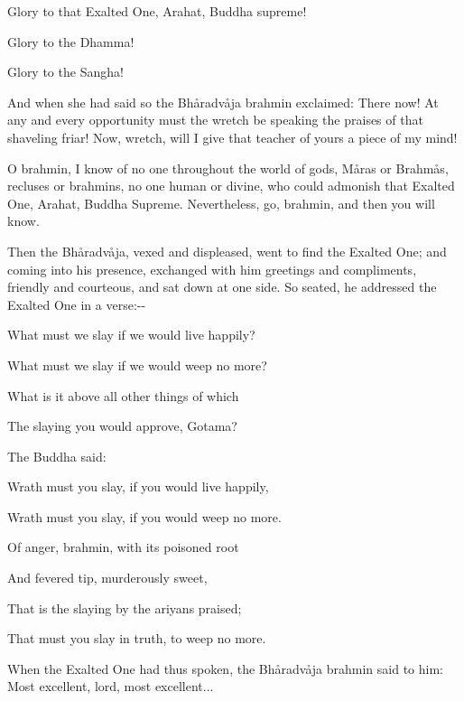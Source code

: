 \documentclass[12pt,twoside]{article}
\begin{document}
{\textasciigrave}{\textasciigrave}Glory to that Exalted One, Arahat,
Buddha supreme!

Glory to the Dhamma!

Glory to the Sangha!{\textquotesingle}{\textquotesingle}

And when she had said so the Bh{\aa}radv{\aa}ja brahmin exclaimed:
{\textasciigrave}{\textasciigrave}There now! At any and every
opportunity must the wretch be speaking the praises of that shaveling
friar! Now, wretch, will I give that teacher of yours a piece of my
mind!{\textquotesingle}{\textquotesingle}

{\textasciigrave}{\textasciigrave}O brahmin, I know of no one throughout
the world of gods, M{\aa}ras or Brahm{\aa}s, recluses or brahmins, no
one human or divine, who could admonish that Exalted One, Arahat,
Buddha Supreme. Nevertheless, go, brahmin, and then you will know.
{\textquotesingle}{\textquotesingle}

Then the Bh{\aa}radv{\aa}ja, vexed and displeased, went to find the
Exalted One; and coming into his presence, exchanged with him greetings
and compliments, friendly and courteous, and sat down at one side. So
seated, he addressed the Exalted One in a verse:{}-{}-


\bigskip

What must we slay if we would live happily?

What must we slay if we would weep no more?

What is it above all other things of which

The slaying you would approve, Gotama?


\bigskip

The Buddha said:


\bigskip

Wrath must you slay, if you would live happily, 

Wrath must you slay, if you would weep no more. 

Of anger, brahmin, with its poisoned root

And fevered tip, murderously sweet, 

That is the slaying by the ariyans praised;

That must you slay in truth, to weep no more. 


\bigskip

When the Exalted One had thus spoken, the Bh{\aa}radv{\aa}ja brahmin
said to him: {\textasciigrave}{\textasciigrave}Most excellent, lord,
most excellent{\textquotesingle}{\textquotesingle}...
\end{document}
